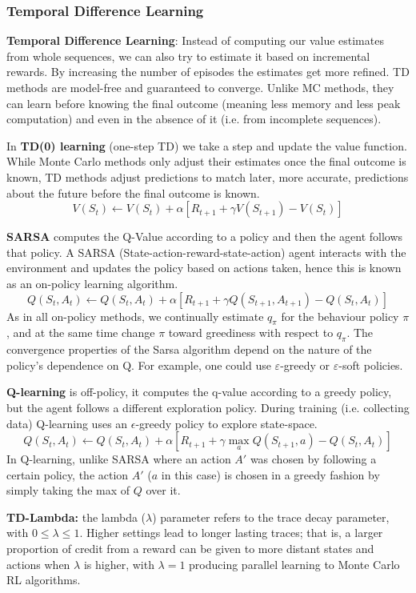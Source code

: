 \documentclass[12pt]{article}
\begin{document}
\subsubsection{Temporal Difference Learning}
\textbf{Temporal Difference Learning}: Instead of computing our value estimates from whole sequences, we can also try to estimate it based on incremental rewards. By increasing the number of episodes the estimates get more refined. TD methods are model-free and guaranteed to converge. Unlike MC methods, they can learn before knowing the final outcome (meaning less memory and less peak computation) and even in the absence of it (i.e. from incomplete sequences).
\par In \textbf{TD(0) learning} (one-step TD) we take a step and update the value function. While Monte Carlo methods only adjust their estimates once the final outcome is known, TD methods adjust predictions to match later, more accurate, predictions about the future before the final outcome is known.
\[ V(S_t) \leftarrow V(S_t) + \alpha [R_{t+1} + \gamma V(S_{t+1}) - V(S_t)] \]
\par \textbf{SARSA} computes the Q-Value according to a policy and then the agent follows that policy. A SARSA (State-action-reward-state-action) agent interacts with the environment and updates the policy based on actions taken, hence this is known as an on-policy learning algorithm.
\[ Q(S_t, A_t) \leftarrow Q(S_t, A_t) + \alpha [R_{t+1} + \gamma Q(S_{t+1},A_{t+1}) - Q(S_t, A_t)] \]
As in all on-policy methods, we continually estimate $q_{\pi}$ for the behaviour policy $\pi$, and at the same time change $\pi$ toward greediness with respect to $q_{\pi}$. The convergence properties of the Sarsa algorithm depend on the nature of the policy's dependence on Q. For example, one could use $\varepsilon$-greedy or $\varepsilon$-soft policies.
\par \textbf{Q-learning} is off-policy, it computes the q-value according to a greedy policy, but the agent follows a different exploration policy. During training (i.e. collecting data) Q-learning uses an $\epsilon$-greedy policy to explore state-space. 
\[ Q(S_t, A_t) \leftarrow Q(S_t, A_t) + \alpha [R_{t+1} + \gamma \max_a Q(S_{t+1},a) - Q(S_t, A_t)] \]
In Q-learning, unlike SARSA where an action $A'$ was chosen by following a certain policy, the action $A'$ ($a$ in this case) is chosen in a greedy fashion by simply taking the max of $Q$ over it.
\par \textbf{TD-Lambda:} the lambda ($\lambda$) parameter refers to the trace decay parameter, with $0\leq \lambda \leq 1$. Higher settings lead to longer lasting traces; that is, a larger proportion of credit from a reward can be given to more distant states and actions when $\lambda$ is higher, with $\lambda =1$ producing parallel learning to Monte Carlo RL algorithms.
\end{document}
